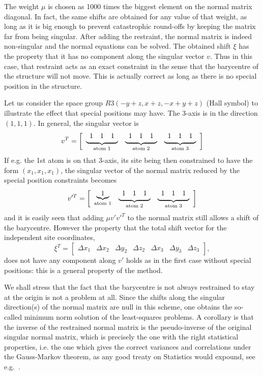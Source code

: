 \documentclass[12pt]{article}
\begin{document}
The weight $\mu$ is chosen as 1000 times the biggest element on the normal matrix diagonal. In fact, the same shifts are obtained for any value of that weight, as long as it is big enough to prevent catastrophic round-offs by keeping the matrix far from being singular. After adding the restraint, the normal matrix is indeed non-singular and the normal equations can be solved. The obtained shift $\xi$ has the property that it has no component along the singular vector $v$. Thus in this case, that restraint acts as an exact constraint in the sense that the barycentre of the structure will not move. This is actually correct as long as there is no special position in the structure. 

Let us consider the space group $R 3 (-y+z, x+z, -x+y+z)$ (Hall symbol) to illustrate the effect that special positions may have. The 3-axis is in the direction $(1, 1, 1)$.  In general, the singular vector is
\renewcommand{\tmp}[1]{\underbrace{\protect\begin{array}{ccc} 1&1&1 \end{array}}_{\text{atom #1}}}
\begin{equation}
v^T = \left[ \begin{array}{ccc} \tmp{1} & \tmp{2} & \tmp{3} \end{array} \right]
\end{equation}
If e.g. the 1st atom is on that 3-axis, its site being then constrained to have the form $(x_1, x_1, x_1)$, the singular vector of the normal matrix reduced by the special position constraints becomes
\begin{equation}
v'^T = \left[ \begin{array}{ccc} \underbrace{1}_{\text{atom 1}} & \tmp{2} & \tmp{3} \end{array} \right]
\end{equation}
and it is easily seen that adding $\mu v' v'^T$ to the normal matrix still allows a shift of the barycentre. However the property that the total shift vector for the independent site coordinates,
\begin{equation}
\xi^T = \begin{bmatrix} \Delta x_1 & \Delta x_2 & \Delta y_2 & \Delta z_2 & \Delta x_3 & \Delta y_3 & \Delta z_3 \end{bmatrix},
\end{equation}
does not have any component along $v'$ holds as in the first case without special positions: this is a general property of the method.

We shall stress that the fact that the barycentre is not always restrained to stay at the origin is not a problem at all. Since the shifts along the singular direction(s) of the normal matrix are null in this scheme, one obtains the so-called minimum norm solution of the least-squares problems. A corollary is that the inverse of the restrained normal matrix is the pseudo-inverse of the original singular normal matrix, which is precisely the one with the right statistical properties, i.e. the one which gives the correct variances and correlations under the Gauss-Markov theorem, as any good treaty on Statistics would expound, see e.g.~\cite{Silvey:1975}.
\end{document}
